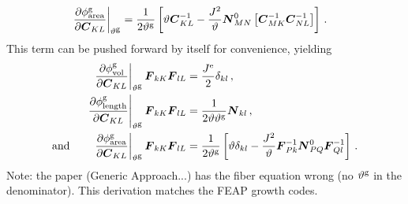 \documentclass[10pt,letterpaper,oneside]{report}
\newcommand{\ten}[1]{\mbox{\boldmath $#1$}{}}
\newcommand{\scas}[1]{\mbox{{\scriptsize{${\rm{#1}}$}}}{}}
\begin{document}
\begin{align}
\left. \frac{ \partial \phi^{\scas{g}}_{\scas{area}} }{ \partial \ten{C}_{KL} } \right|_{\vartheta^{\scas{g}}} 
={}& \frac{1}{2 \vartheta^{\scas{g}}} \left[ \vartheta \ten{C}^{-1}_{KL} - \frac{J^2}{\vartheta} \ten{N}^0_{MN} \left[ \ten{C}^{-1}_{MK} \ten{C}^{-1}_{NL} \right] \right] \, .
\end{align}
This term can be pushed forward by itself for convenience, yielding 
\begin{align}
\left. \frac{\partial \phi^{\scas{g}}_{\scas{vol}} }{\partial \ten{C}_{KL}} \right|_{\vartheta^{\scas{g}}} \ten{F}_{kK} \ten{F}_{lL} 
={}& \frac{J^{\scas{e}}}{2} \delta_{kl} \, , 
\label{growth_criterion_deriv_vol}
\\
\left. \frac{ \partial \phi^{\scas{g}}_{\scas{length}} }{ \partial \ten{C}_{KL} } \right|_{\vartheta^{\scas{g}}} \ten{F}_{kK} \ten{F}_{lL} 
={}& \frac{1}{2 \vartheta \vartheta^{\scas{g}}} \ten{N}_{kl} \, , 
\label{growth_criterion_deriv_length}
\\ \mbox{and} \qquad
\left. \frac{ \partial \phi^{\scas{g}}_{\scas{area}} }{ \partial \ten{C}_{KL} } \right|_{\vartheta^{\scas{g}}} \ten{F}_{kK} \ten{F}_{lL} 
={}& \frac{1}{2 \vartheta^{\scas{g}}} \left[ \vartheta \delta_{kl} - \frac{J^2}{\vartheta} \ten{F}^{-1}_{Pk} \ten{N}^0_{PQ} \ten{F}^{-1}_{Ql} \right] \, . 
\label{growth_criterion_deriv_area}
\end{align}
Note: the paper (Generic Approach...) has the fiber equation wrong (no $\vartheta^{\scas{g}}$ in the denominator).  This derivation matches the FEAP growth codes.  
\end{document}
